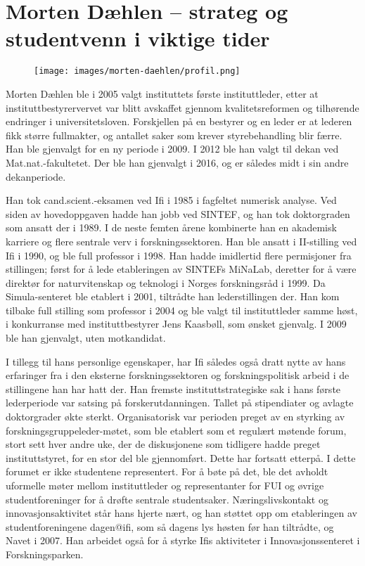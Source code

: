 \chapter[Morten Dæhlen]{Morten Dæhlen – strateg og studentvenn i viktige tider}

\author{Skrevet av Narve Trædal}

\begin{figure}
	\texttt{[image: images/morten-daehlen/profil.png]}
	\label{fig:morten-daehlen}
\end{figure}

Morten Dæhlen ble i 2005 valgt instituttets første instituttleder, etter at instituttbestyrervervet var blitt avskaffet gjennom kvalitetsreformen og tilhørende endringer i universitetsloven. Forskjellen på en bestyrer og en leder er at lederen fikk større fullmakter, og antallet saker som krever styrebehandling blir færre. Han ble gjenvalgt for en ny periode i 2009. I 2012 ble han valgt til dekan ved Mat.nat.-fakultetet. Der ble han gjenvalgt i 2016, og er således midt i sin andre dekanperiode.

Han tok cand.scient.-eksamen ved Ifi i 1985 i fagfeltet numerisk analyse. Ved siden av hovedoppgaven hadde han jobb ved SINTEF, og han tok doktorgraden som ansatt der i 1989. I de neste femten årene kombinerte han en akademisk karriere og flere sentrale verv i forskningssektoren. Han ble ansatt i II-stilling ved Ifi i 1990, og ble full professor i 1998. Han hadde imidlertid flere permisjoner fra stillingen; først for å lede etableringen av SINTEFs MiNaLab, deretter for å være direktør for naturvitenskap og teknologi i Norges forskningsråd i 1999. Da Simula-senteret ble etablert i 2001, tiltrådte han lederstillingen der. Han kom tilbake full stilling som professor i 2004 og ble valgt til instituttleder samme høst, i konkurranse med instituttbestyrer Jens Kaasbøll, som ønsket gjenvalg. I 2009 ble han gjenvalgt, uten motkandidat.

I tillegg til hans personlige egenskaper, har Ifi således også dratt nytte av hans erfaringer fra i den eksterne forskningssektoren og forskningspolitisk arbeid i de stillingene han har hatt der. Han fremste instituttstrategiske sak i hans første lederperiode var satsing på forskerutdanningen. Tallet på stipendiater og avlagte doktorgrader økte sterkt. Organisatorisk var perioden preget av en styrking av forskningsgruppeleder-møtet, som ble etablert som et regulært møtende forum, stort sett hver andre uke, der de diskusjonene som tidligere hadde preget instituttstyret, for en stor del ble gjennomført. Dette har fortsatt etterpå. I dette forumet er ikke studentene representert. For å bøte på det, ble det avholdt uformelle møter mellom instituttleder og representanter for FUI og øvrige studentforeninger for å drøfte sentrale studentsaker. Næringslivskontakt og innovasjonsaktivitet står hans hjerte nært, og han støttet opp om etableringen av studentforeningene dagen@ifi, som så dagens lys høsten før han tiltrådte, og Navet i 2007. Han arbeidet også for å styrke Ifis aktiviteter i Innovasjonssenteret i Forskningsparken.

